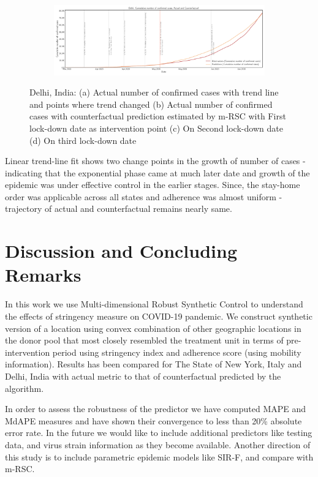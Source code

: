 \documentclass[final,authoryear,5p,times,twocolumn]{elsarticle}
\begin{document}
\begin{figure}
		\begin{subfigure}[b]{\textwidth}
			\centering
			\includegraphics[width=0.8\linewidth,height=0.18\textheight]{FIG20}
		\end{subfigure}
		
		\caption[Delhi]{Delhi, India: (a) Actual number of confirmed cases with  trend line and points where trend changed (b) Actual number of confirmed cases with counterfactual prediction estimated by m-RSC with First lock-down date as intervention point (c) On Second lock-down date (d) On third  lock-down date}
		\label{fig7} 
	\end{figure}
	
	Linear trend-line fit shows two change points in the growth of number of cases - indicating that the exponential phase came at much later date and growth of the epidemic was under effective control in the earlier stages. Since, the stay-home order was applicable across all states and adherence was almost uniform -  trajectory of actual and counterfactual remains nearly same.
	
	\section{Discussion and Concluding Remarks}
	\label{SEC5}
	In this work we use Multi-dimensional Robust Synthetic Control to understand the effects of stringency measure on COVID-19 pandemic. We construct synthetic version of a location using convex combination of other geographic locations in the donor pool that most closely resembled the treatment unit in terms of pre-intervention period using stringency index and adherence score (using mobility information). Results has been compared for The State of New York, Italy and Delhi, India with actual metric to that of counterfactual predicted by the algorithm.
	
	In order to assess the robustness of the predictor we have computed MAPE and MdAPE measures and have shown their convergence to less than 20\% absolute error rate. In the future we would like to include  additional predictors like testing data, and virus strain information as they become available. Another direction of this study is to include parametric epidemic models like SIR-F\cite{Siettos2013}, and compare with m-RSC.
	
\end{document}
